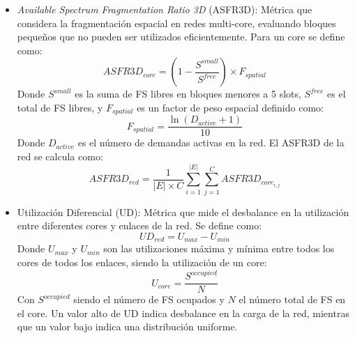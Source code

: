 \begin{itemize}
    \item \textit{Available Spectrum Fragmentation Ratio 3D} (ASFR3D): Métrica que considera la fragmentación espacial en redes multi-core, evaluando bloques pequeños que no pueden ser utilizados eficientemente. Para un core se define como:
    \begin{equation}
        ASFR3D_{core} = \left(1 - \frac{S^{small}}{S^{free}}\right) \times F_{spatial}
    \end{equation}
    Donde \(S^{small}\) es la suma de FS libres en bloques menores a 5 slots, \(S^{free}\) es el total de FS libres, y \(F_{spatial}\) es un factor de peso espacial definido como:
    \begin{equation}
        F_{spatial} = \frac{\ln(D_{active} + 1)}{10}
    \end{equation}
    Donde \(D_{active}\) es el número de demandas activas en la red.
    El ASFR3D de la red se calcula como:
    \begin{equation}
        ASFR3D_{red} = \frac{1}{\left | E \right | \times C} \sum_{i=1}^{\left | E \right |} \sum_{j=1}^{C} ASFR3D_{core_{i,j}}
    \end{equation}
    
    \item Utilización Diferencial (UD): Métrica que mide el desbalance en la utilización entre diferentes cores y enlaces de la red. Se define como:
    \begin{equation}
        UD_{red} = U_{max} - U_{min}
    \end{equation}
    Donde \(U_{max}\) y \(U_{min}\) son las utilizaciones máxima y mínima entre todos los cores de todos los enlaces, siendo la utilización de un core:
    \begin{equation}
        U_{core} = \frac{S^{occupied}}{N}
    \end{equation}
    Con \(S^{occupied}\) siendo el número de FS ocupados y \(N\) el número total de FS en el core. Un valor alto de UD indica desbalance en la carga de la red, mientras que un valor bajo indica una distribución uniforme.
    
\end{itemize}

